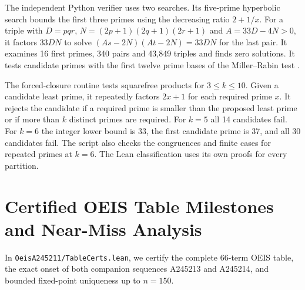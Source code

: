 \documentclass[11pt,reqno]{amsart}
\theoremstyle{plain}
\theoremstyle{definition}
\theoremstyle{remark}
\newcommand{\leanid}[1]{\texttt{\upshape\def\_{\char95\relax}#1}}
\begin{document}
The independent Python verifier uses two searches. Its five-prime hyperbolic search bounds the first three primes using the decreasing ratio $2+1/x$. For a triple with $D=pqr$, $N=(2p+1)(2q+1)(2r+1)$ and $A=33D-4N>0$, it factors $33DN$ to solve $(As-2N)(At-2N)=33DN$ for the last pair. It examines 16 first primes, 340 pairs and 43,849 triples and finds zero solutions. It tests candidate primes with the first twelve prime bases of the Miller--Rabin test \cite{Miller1976,Rabin1980,SorensonWebster2017}.

The forced-closure routine tests squarefree products for $3\le k\le10$. Given a candidate least prime, it repeatedly factors $2x+1$ for each required prime $x$. It rejects the candidate if a required prime is smaller than the proposed least prime or if more than $k$ distinct primes are required. For $k=5$ all 14 candidates fail. For $k=6$ the integer lower bound is 33, the first candidate prime is 37, and all 30 candidates fail. The script also checks the congruences and finite cases for repeated primes at $k=6$. The Lean classification uses its own proofs for every partition.

\section{Certified OEIS Table Milestones and Near-Miss Analysis}

In \leanid{OeisA245211/TableCerts.lean}, we certify the complete 66-term OEIS table, the exact onset of both companion sequences A245213 and A245214, and bounded fixed-point uniqueness up to $n = 150$.
\end{document}

